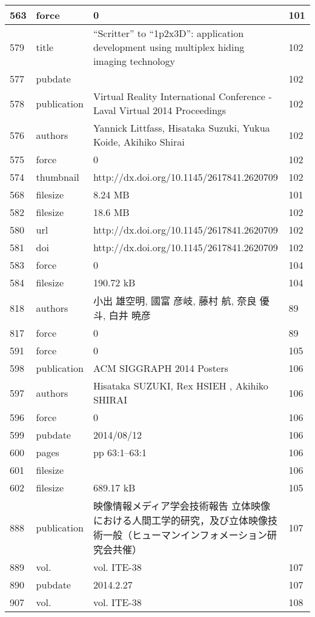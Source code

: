 \begin{longtable}{|l|l|l|l|}
563 & force & 0 & 101 \\ \hline 
579 & title & “Scritter” to “1p2x3D”: application development using multiplex hiding imaging technology & 102 \\ \hline 
577 & pubdate &  & 102 \\ \hline 
578 & publication & Virtual Reality International Conference - Laval Virtual 2014 Proceedings  & 102 \\ \hline 
576 & authors & Yannick Littfass, Hisataka Suzuki, Yukua Koide, Akihiko Shirai & 102 \\ \hline 
575 & force & 0 & 102 \\ \hline 
574 & thumbnail & http://dx.doi.org/10.1145/2617841.2620709  & 102 \\ \hline 
568 & filesize & 8.24 MB & 101 \\ \hline 
582 & filesize & 18.6 MB & 102 \\ \hline 
580 & url & http://dx.doi.org/10.1145/2617841.2620709  & 102 \\ \hline 
581 & doi & http://dx.doi.org/10.1145/2617841.2620709  & 102 \\ \hline 
583 & force & 0 & 104 \\ \hline 
584 & filesize & 190.72 kB & 104 \\ \hline 
818 & authors & 小出 雄空明, 國富 彦岐, 藤村 航, 奈良 優斗, 白井 暁彦 & 89 \\ \hline 
817 & force & 0 & 89 \\ \hline 
591 & force & 0 & 105 \\ \hline 
598 & publication & ACM SIGGRAPH 2014 Posters & 106 \\ \hline 
597 & authors & Hisataka SUZUKI, Rex HSIEH , Akihiko SHIRAI & 106 \\ \hline 
596 & force & 0 & 106 \\ \hline 
599 & pubdate & 2014/08/12 & 106 \\ \hline 
600 & pages & pp 63:1--63:1 & 106 \\ \hline 
601 & filesize &  & 106 \\ \hline 
602 & filesize & 689.17 kB & 105 \\ \hline 
888 & publication & 映像情報メディア学会技術報告 立体映像における人間工学的研究，及び立体映像技術一般（ヒューマンインフォメーション研究会共催）  & 107 \\ \hline 
889 & vol. & vol. ITE-38 & 107 \\ \hline 
890 & pubdate & 2014.2.27  & 107 \\ \hline 
907 & vol. & vol. ITE-38 & 108 \\ \hline 

\end{longtable}
